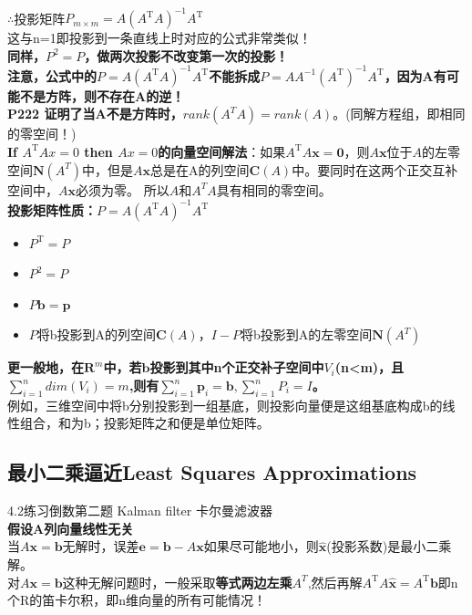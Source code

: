 \documentclass[UTF8]{article}
\begin{document}
    \\
    $\therefore$投影矩阵$P_{m\times m}=A\left(A^{\mathrm{T}} A\right)^{-1} A^{\mathrm{T}}$
    \\
    这与n=1即投影到一条直线上时对应的公式非常类似！\\
    \textbf{同样，$P^2=P$，做两次投影不改变第一次的投影！}\\
    \textbf{注意，公式中的$P=A\left(A^{\mathrm{T}} A\right)^{-1} A^{\mathrm{T}}$不能拆成$P=A A^{-1}\left(A^{\mathrm{T}}\right)^{-1} A^{\mathrm{T}}$，因为A有可能不是方阵，则不存在A的逆！}
    \\
    \textbf{P222 证明了当A不是方阵时，$rank(A^T A)=rank(A)$}。(同解方程组，即相同的零空间！) \\
    \textbf{If $A^{\mathrm{T}} A x=0$ then $A x=0$的向量空间解法}：如果$A^{\mathrm{T}} A \boldsymbol{x}=\mathbf{0}$，则$A\bm{x}$位于$A$的左零空间$\bm{N}(A^T)$中，但是$A\bm{x}$总是在A的列空间$\bm{C}(A)$中。要同时在这两个正交互补空间中，$A\bm{x}$必须为零。 所以$A$和$A^T A$具有相同的零空间。
    \\
    \textbf{投影矩阵性质：$P=A\left(A^{\mathrm{T}} A\right)^{-1} A^{\mathrm{T}}$}
    \begin{itemize}
        \item $P^{\mathrm{T}}=P$
        \item $P^{2}=P$
        \item $P \boldsymbol{b}=\boldsymbol{p}$
        \item $P$将b投影到A的列空间$\bm{C}(A)$，$I-P$将b投影到A的左零空间$\bm{N}(A^T)$
    \end{itemize}
    \textbf{更一般地，在$\bm{R}^m$中，若$\bm{b}$投影到其中n个正交补子空间中$V_i$(n<m)，且$\sum_{i=1}^{n}dim(V_i)=m$,则有$\sum_{i=1}^{n}\bm{p}_i=\bm{b}, \sum_{i=1}^{n}P_i=I$。}
    \\
    例如，三维空间中将b分别投影到一组基底，则投影向量便是这组基底构成b的线性组合，和为b；投影矩阵之和便是单位矩阵。

    \subsection{最小二乘逼近Least Squares Approximations}
    4.2练习倒数第二题 Kalman filter 卡尔曼滤波器\\
    \textbf{假设A列向量线性无关}\\
    当$A \boldsymbol{x}=\bm{b}$无解时，误差$\bm{e}=\bm{b}-A \bm{x}$如果尽可能地小，则$\hat{\bm{x}}$(投影系数)是最小二乘解。
    \\
    对$A \boldsymbol{x}=\bm{b}$这种无解问题时，一般采取\textbf{等式两边左乘$A^T$},然后再解$A^{\mathrm{T}} A \widehat{\boldsymbol{x}}=A^{\mathrm{T}} \boldsymbol{b}$即n个R的笛卡尔积，即n维向量的所有可能情况！
\end{document}
